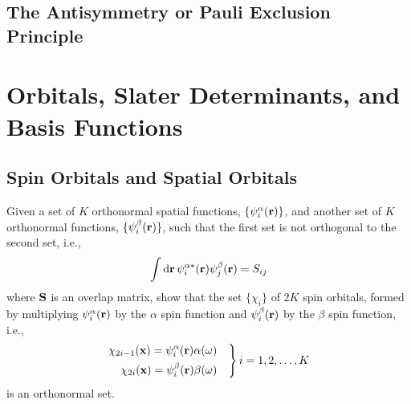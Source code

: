 \documentclass[a4paper]{book}
\newcounter{exercise}[chapter]
\newcommand*{\dif}{\mathop{}\!\mathrm{d}}
\newcommand{\bfr}{{\bf r}}
\newcommand{\bfx}{{\bf x}}
\begin{document}
	\subsection{The Antisymmetry or Pauli Exclusion Principle}
	
	\section{Orbitals, Slater Determinants, and Basis Functions}
	
	\subsection{Spin Orbitals and Spatial Orbitals}
	
	\begin{exercise}
	Given a set of $K$ orthonormal spatial functions, $\{\psi^\alpha_i(\bfr)\}$, and another set of $K$ orthonormal functions, $\{\psi^\beta_i(\bfr)\}$, such that the first set is not orthogonal to the second set, i.e., 
	\[
		\int \dif \bfr \, \psi^{\alpha*}_i( \bfr ) \psi^\beta_j( \bfr ) = S_{ij}
	\]
	where ${\bf S}$ is an overlap matrix, show that the set $\{ \chi_i \}$ of $2K$ spin orbitals, formed by multiplying $\psi^\alpha_i( \bfr )$ by the $\alpha$ spin function and $\psi^\beta_i( \bfr )$ by the $\beta$ spin function, i.e.,
	\[ \left.
	\begin{rgathered}
		\chi_{2i-1}(\bfx) = \psi^\alpha_i( \bfr ) \alpha( \omega ) \quad \\
		\chi_{2i}(\bfx) = \psi^\beta_i( \bfr ) \beta( \omega ) \quad
	\end{rgathered} \right\} i = 1, 2, \ldots, K
	\]
	is an orthonormal set.
	\end{exercise}
	
\end{document}
